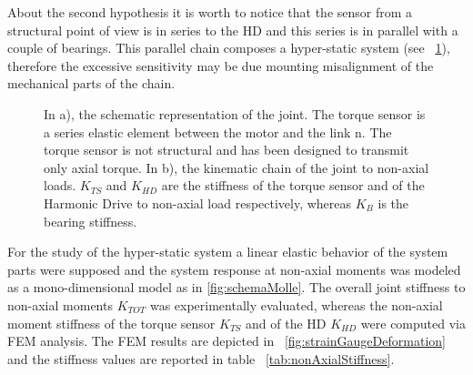 \documentclass[journal]{IEEEtran}
\begin{document}
About the second hypothesis it is worth to notice that the sensor from a structural point of view is in series to the HD and this series is in parallel with a couple of bearings. This parallel chain composes a hyper-static system (see \figurename \ \ref{fig:schemaGiuntoEMolle}), therefore the excessive sensitivity may be due mounting misalignment of the mechanical parts of the chain. 
%
\begin{figure}[]
	\centering
	\caption{In a), the schematic representation of the joint. The torque sensor is a series elastic element between the motor and the link n. The torque sensor is not structural and has been designed to transmit only axial torque. In b), the kinematic chain of the joint to non-axial loads. $K_{TS}$ and $K_{HD}$ are the stiffness of the torque sensor and of the Harmonic Drive to non-axial load respectively, whereas $K_B$ is the bearing stiffness.}
	\label{fig:schemaGiuntoEMolle}
\end{figure}
%
\par For the study of the hyper-static system a linear  elastic behavior of the system parts were supposed and the system response at non-axial moments was modeled as a mono-dimensional model as in \figurename \ref{fig:schemaMolle}.
The overall joint stiffness to non-axial moments $K_{TOT}$ was experimentally evaluated, whereas the non-axial moment stiffness of the torque sensor $K_{TS}$ and of the HD $K_{HD}$ were computed via FEM analysis. The FEM results are depicted in \figurename \ \ref{fig:strainGaugeDeformation} and the stiffness values are reported in table \tablename \ \ref{tab:nonAxialStiffness}.
\end{document}
